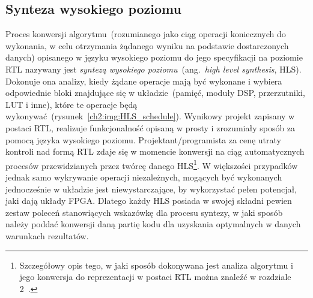 \subsection{Synteza wysokiego poziomu}
Proces konwersji algorytmu~(rozumianego jako ciąg operacji koniecznych do wykonania, w celu otrzymania żądanego wyniku na podstawie dostarczonych danych) opisanego w języku wysokiego poziomu do jego specyfikacji na poziomie RTL nazywany jest \textit{syntezą wysokiego poziomu}~(ang.~\textit{high level synthesis}, HLS). Dokonuje ona analizy, kiedy żądane operacje mają być wykonane i wybiera odpowiednie bloki znajdujące się w układzie~(pamięć, moduły DSP, przerzutniki, LUT i inne), które te operacje będą wykonywać~(rysunek~\ref{ch2:img:HLS_schedule}). 
Wynikowy projekt zapisany w postaci RTL, realizuje funkcjonalność opisaną w prosty i zrozumiały sposób za pomocą języka wysokiego poziomu. Projektant/programista za cenę utraty kontroli nad formą RTL zdaje się w momencie konwersji na ciąg automatycznych procesów przewidzianych przez twórcę danego HLS\footnote{Szczegółowy opis tego, w jaki sposób dokonywana jest analiza algorytmu i jego konwersja do reprezentacji w postaci RTL można znaleźć w rozdziale 2~\cite{FPGA_SD}.}. W większości przypadków jednak samo wykrywanie operacji niezależnych, mogących być wykonanych jednocześnie w układzie jest niewystarczające, by wykorzystać pełen potencjał, jaki dają układy FPGA. Dlatego każdy HLS posiada w swojej składni pewien zestaw poleceń stanowiących wskazówkę dla procesu syntezy, w jaki sposób należy poddać konwersji daną partię kodu dla uzyskania optymalnych w danych warunkach rezultatów.

